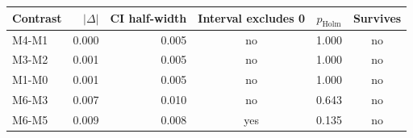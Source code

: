 \begin{tabular}{lrrccc}
\toprule
Contrast & $|\Delta|$ & CI half-width & Interval excludes 0 & $p_{\mathrm{Holm}}$ & Survives \\
\midrule
M4-M1 & 0.000 & 0.005 & no & 1.000 & no \\
M3-M2 & 0.001 & 0.005 & no & 1.000 & no \\
M1-M0 & 0.001 & 0.005 & no & 1.000 & no \\
M6-M3 & 0.007 & 0.010 & no & 0.643 & no \\
M6-M5 & 0.009 & 0.008 & yes & 0.135 & no \\
\bottomrule
\end{tabular}
